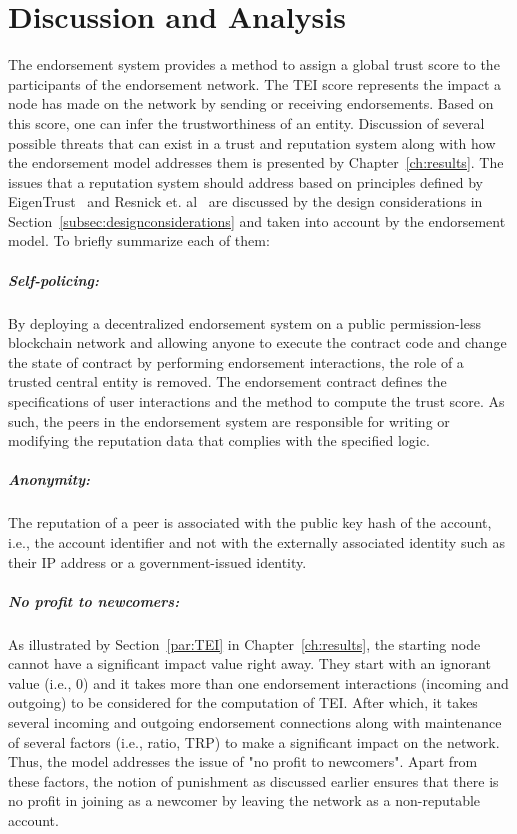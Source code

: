 \chapter{Discussion and Analysis} \label{ch:discussion}
The endorsement system provides a method to assign a global trust score to the
participants of the endorsement network. The \ac{TEI} score represents the
impact a node has made on the network by sending or receiving endorsements.
Based on this score, one can infer the trustworthiness of an entity. Discussion
of several possible threats that can exist in a trust and reputation system
along with how the endorsement model addresses them is presented by
Chapter~\ref{ch:results}. The issues that a reputation system should address
based on principles defined by EigenTrust~\cite{kamvar2003eigentrust} and
Resnick et. al~\cite{resnick2000reputation} are discussed by the design
considerations in Section~\ref{subsec:designconsiderations} and taken into
account by the endorsement model. To briefly summarize each of them:  

\paragraph{Self-policing:}By deploying a decentralized endorsement system on a
public permission-less blockchain network and allowing anyone to execute the
contract code and change the state of contract by performing endorsement
interactions, the role of a trusted central entity is removed. The endorsement
contract defines the specifications of user interactions and the method to
compute the trust score. As such, the peers in the endorsement system are
responsible for writing or modifying the reputation data that complies with the
specified logic.   
\paragraph{Anonymity:} The reputation of a peer is associated with the public
key hash of the account, i.e., the account identifier and not with the
externally associated identity such as their IP address or a government-issued
identity.  
\paragraph{No profit to newcomers:}As illustrated by Section~\ref{par:TEI} in
Chapter~\ref{ch:results}, the starting node cannot have a significant impact
value right away. They start with an ignorant value (i.e., 0) and it takes more
than one endorsement interactions (incoming and outgoing) to be considered for
the computation of \ac{TEI}. After which, it takes several incoming and
outgoing endorsement connections along with maintenance of several factors
(i.e., ratio, \ac{TRP}) to make a significant impact on the network. Thus, the
model addresses the issue of "no profit to newcomers". Apart from these
factors, the notion of punishment as discussed earlier ensures that there is no
profit in joining as a newcomer by leaving the network as a non-reputable
account.   
